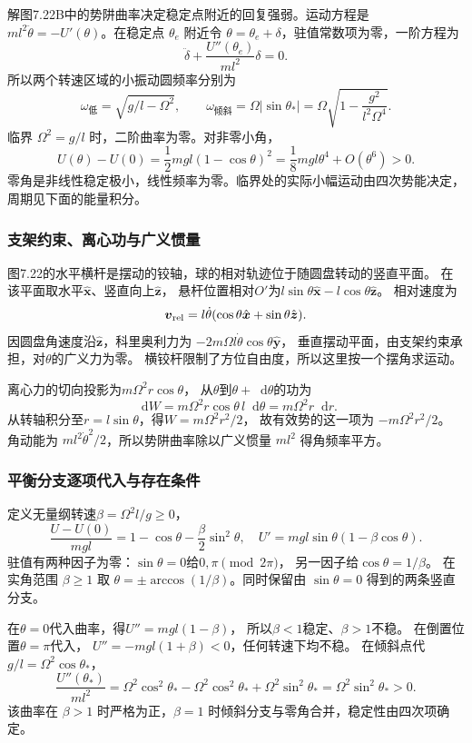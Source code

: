 \documentclass[UTF8,fontset=fandol,a4paper,11pt]{ctexart}
\newcommand{\dd}{\mathop{}\!\mathrm{d}}
\begin{document}
解图7.22B中的势阱曲率决定稳定点附近的回复强弱。运动方程是 $ml^2\ddot\theta=-U'(\theta)$。在稳定点 $\theta_e$ 附近令 $\theta=\theta_e+\delta$，驻值常数项为零，一阶方程为
\[\ddot\delta+\frac{U''(\theta_e)}{ml^2}\delta=0.\]
所以两个转速区域的小振动圆频率分别为
\[\boxed{\omega_{
\text{低}}=\sqrt{g/l-\Omega^2},\qquad
\omega_{
\text{倾斜}}=\Omega|\sin\theta_*|
=\Omega\sqrt{1-\frac{g^2}{l^2\Omega^4}}.}\]
临界 $\Omega^2=g/l$ 时，二阶曲率为零。对非零小角，
\[U(\theta)-U(0)=\frac12mgl(1-\cos\theta)^2
=\frac18mgl\theta^4+O(\theta^6)>0.\]
零角是非线性稳定极小，线性频率为零。临界处的实际小幅运动由四次势能决定，周期见下面的能量积分。
\subsubsection*{支架约束、离心功与广义惯量}
图7.22的水平横杆是摆动的铰轴，球的相对轨迹位于随圆盘转动的竖直平面。
在该平面取水平$\hat{\boldsymbol x}$、竖直向上$\hat{\boldsymbol z}$，
悬杆位置相对$O'$为$l\sin\theta\hat{\boldsymbol x}-l\cos\theta\hat{\boldsymbol z}$。
相对速度为
\[
\boldsymbol v_{\rm rel}=l\dot\theta
(\cos\theta\hat{\boldsymbol x}+\sin\theta\hat{\boldsymbol z}).
\]
因圆盘角速度沿$\hat{\boldsymbol z}$，科里奥利力为
$-2m\Omega l\dot\theta\cos\theta\hat{\boldsymbol y}$，
垂直摆动平面，由支架约束承担，对$\theta$的广义力为零。
横铰杆限制了方位自由度，所以这里按一个摆角求运动。

离心力的切向投影为$m\Omega^2r\cos\theta$，
从$\theta$到$\theta+\dd\theta$的功为
\[
\dd W=m\Omega^2r\cos\theta\,l\dd\theta
=m\Omega^2r\dd r.
\]
从转轴积分至$r=l\sin\theta$，得$W=m\Omega^2r^2/2$，
故有效势的这一项为 $-m\Omega^2r^2/2$。
角动能为 $ml^2\dot\theta^2/2$，所以势阱曲率除以广义惯量 $ml^2$ 得角频率平方。

\subsubsection*{平衡分支逐项代入与存在条件}
定义无量纲转速$\beta=\Omega^2l/g\ge0$，
\[
\frac{U-U(0)}{mgl}=1-\cos\theta-\frac\beta2\sin^2\theta,
\quad U'=mgl\sin\theta(1-\beta\cos\theta).
\]
驻值有两种因子为零：$\sin\theta=0$给$0,\pi\pmod{2\pi}$，
另一因子给$\cos\theta=1/\beta$。
在实角范围 $\beta\ge1$ 取 $\theta=\pm\arccos(1/\beta)$。同时保留由 $\sin\theta=0$ 得到的两条竖直分支。

在$\theta=0$代入曲率，得$U''=mgl(1-\beta)$，
所以$\beta<1$稳定、$\beta>1$不稳。
在倒置位置$\theta=\pi$代入，
$U''=-mgl(1+\beta)<0$，任何转速下均不稳。
在倾斜点代$g/l=\Omega^2\cos\theta_*$，
\[
\frac{U''(\theta_*)}{ml^2}
=\Omega^2\cos^2\theta_*
-\Omega^2\cos^2\theta_*+\Omega^2\sin^2\theta_*
=\Omega^2\sin^2\theta_*>0.
\]
该曲率在 $\beta>1$ 时严格为正，$\beta=1$ 时倾斜分支与零角合并，稳定性由四次项确定。
\end{document}
